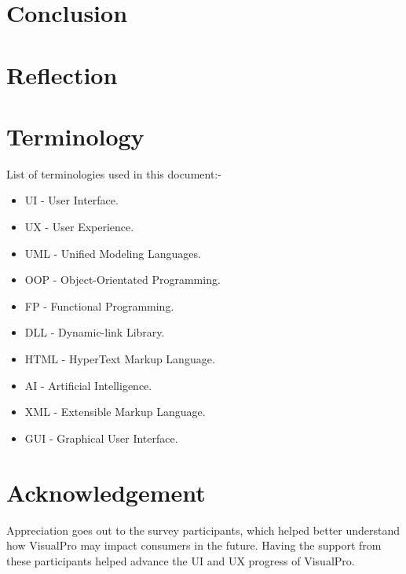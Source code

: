 \documentclass[12pt]{report} %
\begin{document}
	\chapter{Conclusion}

	\chapter{Reflection}

	\chapter{Terminology}
		List of terminologies used in this document:-
		\begin{itemize}
		\item UI - User Interface.
		\item UX - User Experience.
		\item UML - Unified Modeling Languages.
		\item OOP - Object-Orientated Programming.
		\item FP - Functional Programming.
		\item DLL - Dynamic-link Library.
		\item HTML - HyperText Markup Language.
		\item AI - Artificial Intelligence.
		\item XML - Extensible Markup Language.
		\item GUI - Graphical User Interface.
		\end{itemize}

	\chapter*{Acknowledgement}
		Appreciation goes out to the survey participants, which helped better understand how VisualPro may impact consumers in the future. Having the support from these participants helped advance the UI and UX progress of VisualPro.

\clearpage
\nocite{*}
\small{
}


\end{document}
